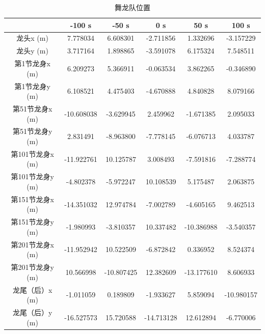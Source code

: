 \documentclass[withoutpreface,bwprint]{cumcmthesis} %
\begin{document}
\begin{table}[H]
	\centering
	\caption{舞龙队位置}
	\begin{tabular}{|c|c|c|c|c|c|}
		\hline
 &-100 s &-50 s &0 s &50 s &100 s \\ \hline
龙头x (m) &7.778034 &6.608301 &-2.711856 &1.332696 &-3.157229 \\ \hline
龙头y (m) &3.717164 &1.898865 &-3.591078 &6.175324 &7.548511 \\ \hline
第1节龙身x (m) &6.209273 &5.366911 &-0.063534 &3.862265 &-0.346890 \\ \hline
第1节龙身y (m) &6.108521 &4.475403 &-4.670888 &4.840828 &8.079166 \\ \hline
第51节龙身x (m) &-10.608038 &-3.629945 &2.459962 &-1.671385 &2.095033 \\ \hline
第51节龙身y (m) &2.831491 &-8.963800 &-7.778145 &-6.076713 &4.033787 \\ \hline
第101节龙身x (m) &-11.922761 &10.125787 &3.008493 &-7.591816 &-7.288774 \\ \hline
第101节龙身y (m) &-4.802378 &-5.972247 &10.108539 &5.175487 &2.063875 \\ \hline
第151节龙身x (m) &-14.351032 &12.974784 &-7.002789 &-4.605165 &9.462513 \\ \hline
第151节龙身y (m) &-1.980993 &-3.810357 &10.337482 &-10.386988 &-3.540357 \\ \hline
第201节龙身x (m) &-11.952942 &10.522509 &-6.872842 &0.336952 &8.524374 \\ \hline
第201节龙身y (m) &10.566998 &-10.807425 &12.382609 &-13.177610 &8.606933 \\ \hline
龙尾（后）x (m) &-1.011059 &0.189809 &-1.933627 &5.859094 &-10.980157 \\ \hline
龙尾（后）y (m) &-16.527573 &15.720588 &-14.713128 &12.612894 &-6.770006 \\ \hline
	\end{tabular}
\end{table}
\end{document}
